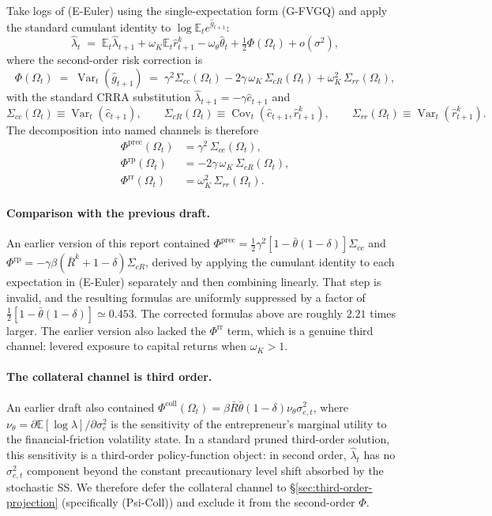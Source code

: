 \documentclass[11pt]{article}
\newcommand{\E}{\mathbb{E}}
\newcommand{\Var}{\operatorname{Var}}
\newcommand{\Cov}{\operatorname{Cov}}
\theoremstyle{plain}
\theoremstyle{definition}
\begin{document}
Take logs of (E-Euler) using the single-expectation form (G-FVGQ) and apply
the standard cumulant identity to $\log\E_t e^{\hat g_{t+1}}$:
\begin{equation}
\hat\lambda_t
\;=\;
\E_t \hat\lambda_{t+1} + \omega_K \E_t \hat r^k_{t+1}
- \omega_\theta \hat\theta_t
+ \tfrac{1}{2}\Phi(\Omega_t) + o(\sigma^2),
\tag{DGP-E-FVGQ}
\end{equation}
where the second-order risk correction is
\begin{equation}
\boxed{
\Phi(\Omega_t) \;=\; \Var_t(\hat g_{t+1})
\;=\;
\gamma^2 \Sigma_{cc}(\Omega_t)
- 2\gamma\,\omega_K\,\Sigma_{cR}(\Omega_t)
+ \omega_K^2\,\Sigma_{rr}(\Omega_t)},
\tag{FVGQ-$\Phi$}
\end{equation}
with the standard CRRA substitution $\hat\lambda_{t+1}=-\gamma\hat c_{t+1}$
and
\[
\Sigma_{cc}(\Omega_t)\equiv\Var_t(\hat c_{t+1}),
\qquad
\Sigma_{cR}(\Omega_t)\equiv\Cov_t(\hat c_{t+1},\hat r^k_{t+1}),
\qquad
\Sigma_{rr}(\Omega_t)\equiv\Var_t(\hat r^k_{t+1}).
\]
The decomposition into named channels is therefore
\begin{align}
\Phi^{\mathrm{prec}}(\Omega_t)
&= \gamma^2 \,\Sigma_{cc}(\Omega_t),
\tag{Prec}\\
\Phi^{\mathrm{rp}}(\Omega_t)
&= -2\gamma\,\omega_K\,\Sigma_{cR}(\Omega_t),
\tag{RP}\\
\Phi^{\mathrm{rr}}(\Omega_t)
&= \omega_K^2\,\Sigma_{rr}(\Omega_t).
\tag{RR}
\end{align}

\paragraph{Comparison with the previous draft.}
An earlier version of this report contained
$\Phi^{\mathrm{prec}}=\tfrac{1}{2}\gamma^2[1-\bar\theta(1-\delta)]\Sigma_{cc}$
and $\Phi^{\mathrm{rp}}=-\gamma\beta(\bar R^k+1-\delta)\Sigma_{cR}$, derived
by applying the cumulant identity to each expectation in (E-Euler) separately
and then combining linearly. That step is invalid, and the resulting formulas
are uniformly suppressed by a factor of $\tfrac{1}{2}[1-\bar\theta(1-\delta)]
\simeq 0.453$. The corrected formulas above are roughly $2.21$ times larger.
The earlier version also lacked the $\Phi^{\mathrm{rr}}$ term, which is a
genuine third channel: levered exposure to capital returns when
$\omega_K>1$.

\paragraph{The collateral channel is third order.}
An earlier draft also contained
$\Phi^{\mathrm{coll}}(\Omega_t)
= \beta\bar R\bar\theta(1-\delta)\nu_\theta\sigma_{e,t}^2$,
where $\nu_\theta = \partial \E[\log\lambda]/\partial\sigma_e^2$ is the
sensitivity of the entrepreneur's marginal utility to the financial-friction
volatility state. In a standard pruned third-order solution, this sensitivity
is a third-order policy-function object: in second order, $\hat\lambda_t$ has
no $\sigma_{e,t}^2$ component beyond the constant precautionary level shift
absorbed by the stochastic SS. We therefore defer the collateral channel to
§\ref{sec:third-order-projection} (specifically (Psi-Coll)) and exclude it
from the second-order $\Phi$.
\end{document}
